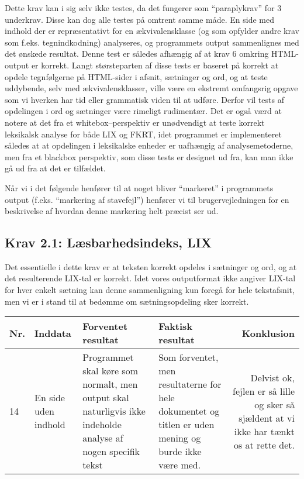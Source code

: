 \documentclass[a4paper,oneside,article]{memoir}
\begin{document}
\begin{landscape}
Dette krav kan i sig selv ikke testes, da det fungerer som
``paraplykrav'' for 3 underkrav. Disse kan dog alle testes på omtrent
samme måde. En side med indhold der er repræsentativt for en
ækvivalensklasse (og som opfylder andre krav som
f.eks. tegnindkodning) analyseres, og programmets output sammenlignes
med det ønskede resultat. Denne test er således afhængig af at krav 6
omkring HTML-output er korrekt. Langt størsteparten af disse tests er
baseret på korrekt at opdele tegnfølgerne på HTML-sider i afsnit,
sætninger og ord, og at teste uddybende, selv med ækvivalensklasser,
ville være en ekstremt omfangsrig opgave som vi hverken har tid eller
grammatisk viden til at udføre. Derfor vil tests af opdelingen i ord
og sætninger være rimeligt rudimentær. Det er også værd at notere at
det fra et whitebox--perspektiv er unødvendigt at teste korrekt
leksikalsk analyse for både LIX og FKRT, idet programmet er
implementeret således at at opdelingen i leksikalske enheder er
uafhængig af analysemetoderne, men fra et blackbox perspektiv, som
disse tests er designet ud fra, kan man ikke gå ud fra at det er
tilfældet.

Når vi i det følgende henfører til at noget bliver ``markeret'' i
programmets output (f.eks. ``markering af stavefejl'') henfører vi til
brugervejledningen for en beskrivelse af hvordan denne markering helt
præcist ser ud.

\subsection{Krav 2.1: Læsbarhedsindeks, LIX}

Det essentielle i dette krav er at teksten korrekt opdeles i sætninger
og ord, og at det resulterende LIX-tal er korrekt. Idet vores
outputformat ikke angiver LIX-tal for hver enkelt sætning kan denne
sammenligning kun foregå for hele tekstafsnit, men vi er i stand til
at bedømme om sætningsopdeling sker korrekt.

\begin{longtable}[c]{p{20pt}|p{220pt}|p{130pt}|p{130pt}|r}
\textbf{Nr.} &
\textbf{Inddata} &
\textbf{Forventet resultat} &
\textbf{Faktisk resultat} &
\textbf{Konklusion} \\ \hline

14 &
En side uden indhold &
Programmet skal køre som normalt, men output skal naturligvis ikke
indeholde analyse af nogen specifik tekst &
Som forventet, men resultaterne for hele dokumentet og titlen er uden
mening og burde ikke være med. &
Delvist ok, fejlen er så lille og sker så sjældent at vi ikke har
tænkt os at rette det. \\ \hline


\end{longtable}
\end{landscape}
\end{document}

